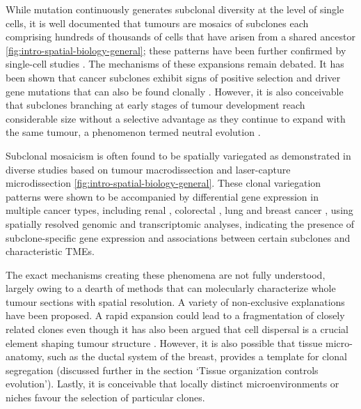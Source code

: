 While mutation continuously generates subclonal diversity at the level of single cells, it is well documented that tumours are mosaics of subclones each comprising hundreds of thousands of cells that have arisen from a shared ancestor \parencite{Shah2009-xz,Nik-Zainal2012-zz,McGranahan2015-gb,Andor2016-hi, Dentro2021-yb} \cref{fig:intro-spatial-biology-general}; these patterns have been further confirmed by single-cell studies \parencite{Navin2011-qq,Wang2014-bp,Casasent2018-gx,McPherson2016-zu,Laks2019-rp,Salehi2021-ad}. The mechanisms of these expansions remain debated. It has been shown that cancer subclones exhibit signs of positive selection and driver gene mutations that can also be found clonally \parencite{Dentro2021-yb}. However, it is also conceivable that subclones branching at early stages of tumour development reach considerable size without a selective advantage as they continue to expand with the same tumour, a phenomenon termed neutral evolution \parencite{Williams2016-qh}.

Subclonal mosaicism is often found to be spatially variegated as demonstrated in diverse studies based on tumour macrodissection \parencite{Navin2010-uw,Gerlinger2012-qm,De_Bruin2014-ow,Gerlinger2014-hr, Yates2015-xk,Morrissy2017-vy,Jamal-Hanjani2017-uv,Watkins2020-gc} and laser-capture microdissection \parencite{Casasent2018-gx, Heide2022-ev,Woodcock2020-nt,Grossmann2021-sl,Zhao2022-xd,Heide2019-rr,Su2018-rr,Bao2018-kj} \cref{fig:intro-spatial-biology-general}. These clonal variegation patterns were shown to be accompanied by differential gene expression in multiple cancer types, including renal \parencite{Gerlinger2012-qm}, colorectal  \parencite{Househam2022-cp}, lung \parencite{Biswas2019-kb} and breast cancer \parencite{Lomakin2022-ks}, using spatially resolved genomic and transcriptomic analyses, indicating the presence of subclone-specific gene expression and associations between certain subclones and characteristic \ac{TME}s.

The exact mechanisms creating these phenomena are not fully understood, largely owing to a dearth of methods that can molecularly characterize whole tumour sections with spatial resolution. A variety of non-exclusive explanations have been proposed. A rapid expansion could lead to a fragmentation of closely related clones \parencite{Sottoriva2015-ci} even though it has also been argued that cell dispersal is a crucial element shaping tumour structure \parencite{Waclaw2015-yw,Gallaher2019-xx}. However, it is also possible that tissue micro-anatomy, such as the ductal system of the breast, provides a template for clonal segregation (discussed further in the section ‘Tissue organization controls evolution’). Lastly, it is conceivable that locally distinct microenvironments or niches favour the selection of particular clones.

